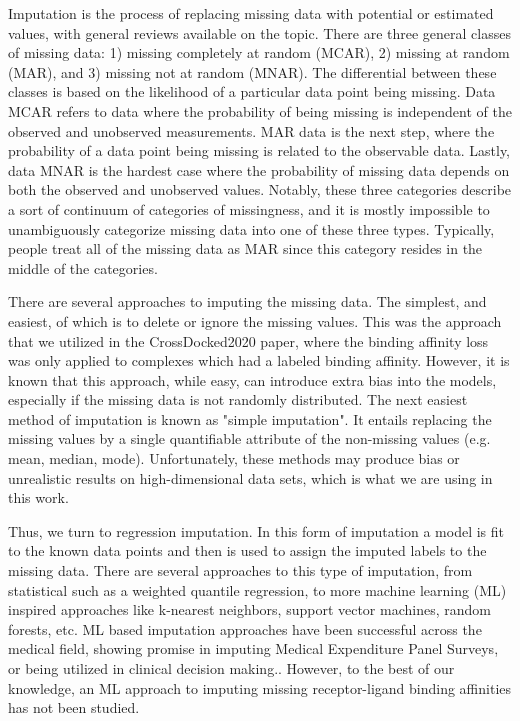 \documentclass[journal=jmcmar,manuscript=article]{achemso}
\begin{document}
Imputation is the process of replacing missing data with potential or estimated values, with general reviews available on the topic.\cite{surveyReview1, review2}
There are three general classes of missing data: 1) missing completely at random (MCAR), 2) missing at random (MAR), and 3) missing not at random (MNAR).
The differential between these classes is based on the likelihood of a particular data point being missing.
Data MCAR refers to data where the probability of being missing is independent of the observed and unobserved measurements.
MAR data is the next step, where the probability of a data point being missing is related to the observable data.
Lastly, data MNAR is the hardest case where the probability of missing data depends on both the observed and unobserved values.
Notably, these three categories describe a sort of continuum of categories of missingness, and it is mostly impossible to unambiguously categorize missing data into one of these three types.
Typically, people treat all of the missing data as MAR since this category resides in the middle of the categories.

There are several approaches to imputing the missing data.
The simplest, and easiest, of which is to delete or ignore the missing values.
This was the approach that we utilized in the CrossDocked2020 paper, where the binding affinity loss was only applied to complexes which had a labeled binding affinity.
However, it is known that this approach, while easy, can introduce extra bias into the models, especially if the missing data is not randomly distributed.\cite{rev1support}
The next easiest method of imputation is known as "simple imputation".
It entails replacing the missing values by a single quantifiable attribute of the non-missing values (e.g. mean, median, mode).
Unfortunately, these methods may produce bias or unrealistic results on high-dimensional data sets, which is what we are using in this work. \cite{SICE}

Thus, we turn to regression imputation.
In this form of imputation a model is fit to the known data points and then is used to assign the imputed labels to the missing data.
There are several approaches to this type of imputation, from statistical such as a weighted quantile regression, to more machine learning (ML) inspired approaches like k-nearest neighbors, support vector machines, random forests, etc.\cite{rev1support,review2}
ML based imputation approaches have been successful across the medical field, showing promise in imputing Medical Expenditure Panel Surveys\cite{MLimpMedsurvey}, or being utilized in clinical decision making.\cite{MLclinicDecision}.
However, to the best of our knowledge, an ML approach to imputing missing receptor-ligand binding affinities has not been studied.
\end{document}
